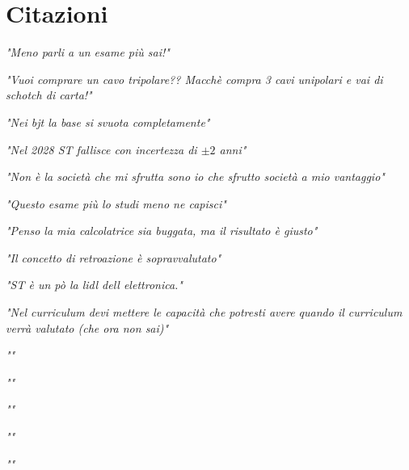\chapter{Citazioni}

\raggedright
{\itshape "Meno parli a un esame più sai!"}
\raggedleft

\vspace{5mm}

\raggedleft
{\itshape "Vuoi comprare un cavo tripolare?? Macchè compra 3 cavi unipolari e vai di schotch di carta!"}
\raggedright

\vspace{5mm}

\raggedright
{\itshape "Nei bjt la base si svuota completamente"}
\raggedleft

\vspace{5mm}

\raggedleft
{\itshape "Nel 2028 ST fallisce con incertezza di $\pm 2$ anni"}
\raggedright

\vspace{5mm}

\raggedright
{\itshape "Non è la società che mi sfrutta sono io che sfrutto società a mio vantaggio"}
\raggedleft

\vspace{5mm}

\raggedleft
{\itshape "Questo esame più lo studi meno ne capisci"}
\raggedright

\vspace{5mm}

\raggedright
{\itshape "Penso la mia calcolatrice sia buggata, ma il risultato è giusto"}
\raggedleft

\vspace{5mm}

\raggedleft
{\itshape "Il concetto di retroazione è sopravvalutato"}
\raggedright

\vspace{5mm}

\raggedright

{\itshape "ST è un pò la lidl dell elettronica."}
\raggedleft

\vspace{5mm}

\raggedright
{\itshape "Nel curriculum devi mettere le capacità che potresti avere quando il curriculum verrà valutato (che ora non sai)"}

\raggedleft

\vspace{5mm}

\raggedleft
{\itshape ""}
\raggedright

\vspace{5mm}

\raggedright
{\itshape ""}
\raggedleft

\vspace{5mm}

\raggedleft
{\itshape ""}
\raggedright

\vspace{5mm}

\raggedright
{\itshape ""}
\raggedleft

\vspace{5mm}

\raggedleft
{\itshape ""}
\raggedright
